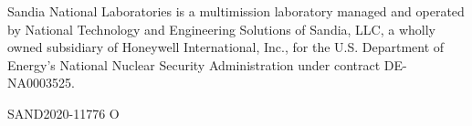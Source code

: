 \documentclass[letterpaper]{scrartcl}
\begin{document}
\vspace*{\fill}
\noindent
Sandia National Laboratories is a multimission laboratory managed and
operated by National Technology and Engineering Solutions of Sandia,
LLC, a wholly owned subsidiary of Honeywell International, Inc., for
the U.S. Department of Energy's National Nuclear Security
Administration under contract DE-NA0003525.

SAND2020-11776 O
\end{document}
